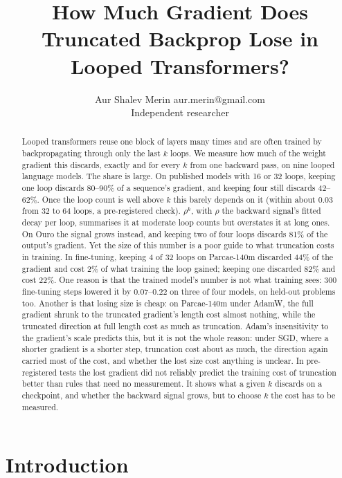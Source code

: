 \documentclass[10pt]{article}
\title{How Much Gradient Does Truncated Backprop Lose in Looped Transformers?}
\author{\name Aur Shalev Merin \email aur.merin@gmail.com \\
      \addr Independent researcher}
\begin{document}
\maketitle

\begin{abstract}
Looped transformers reuse one block of layers many times and are often trained by backpropagating through only the last $k$ loops. We measure how much of the weight gradient this discards, exactly and for every $k$ from one backward pass, on nine looped language models. The share is large. On published models with 16 or 32 loops, keeping one loop discards 80--90\% of a sequence's gradient, and keeping four still discards 42--62\%. Once the loop count is well above $k$ this barely depends on it (within about 0.03 from 32 to 64 loops, a pre-registered check). $\rho^{k}$, with $\rho$ the backward signal's fitted decay per loop, summarises it at moderate loop counts but overstates it at long ones. On Ouro the signal grows instead, and keeping two of four loops discards 81\% of the output's gradient. Yet the size of this number is a poor guide to what truncation costs in training. In fine-tuning, keeping 4 of 32 loops on Parcae-140m discarded 44\% of the gradient and cost 2\% of what training the loop gained; keeping one discarded 82\% and cost 22\%. One reason is that the trained model's number is not what training sees: 300 fine-tuning steps lowered it by 0.07--0.22 on three of four models, on held-out problems too. Another is that losing size is cheap: on Parcae-140m under AdamW, the full gradient shrunk to the truncated gradient's length cost almost nothing, while the truncated direction at full length cost as much as truncation. Adam's insensitivity to the gradient's scale predicts this, but it is not the whole reason: under SGD, where a shorter gradient is a shorter step, truncation cost about as much, the direction again carried most of the cost, and whether the lost size cost anything is unclear. In pre-registered tests the lost gradient did not reliably predict the training cost of truncation better than rules that need no measurement. It shows what a given $k$ discards on a checkpoint, and whether the backward signal grows, but to choose $k$ the cost has to be measured.
\end{abstract}

\section{Introduction}\label{sec:1}
\end{document}
